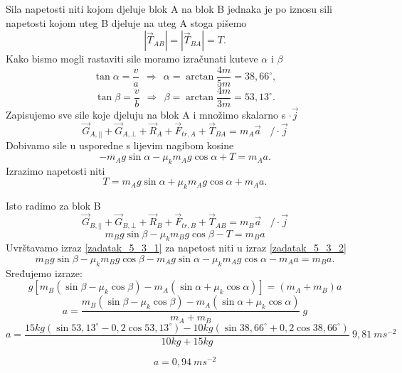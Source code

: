 
Sila napetosti niti kojom djeluje blok A na blok B jednaka je po iznosu sili napetosti kojom uteg B 
djeluje na uteg A stoga pišemo
$$ |\vec{T}_{AB}|=|\vec{T}_{BA}|=T. $$ 
Kako bismo mogli rastaviti sile moramo izračunati kuteve $\alpha$ i $\beta$
$$\tan\alpha=\frac{v}{a}   \ \ \Rightarrow \ \  \alpha=\arctan\frac{4m}{5m}=38,66^\circ, $$
$$\tan\beta=\frac{v}{b}   \ \ \Rightarrow \ \  \beta=\arctan\frac{4m}{3m}=53,13^\circ .$$
Zapisujemo sve sile koje djeluju na blok A i množimo skalarno s $\cdot\vec{j}$ 
$$\vec{G}_{A,||} + \vec{G}_{A,\bot} + \vec{R}_A + \vec{F}_{tr,A} + \vec{T}_{BA}=m_A \vec{a}  \ \ \ \  /\cdot\vec{j}   $$
Dobivamo sile u usporedne s lijevim nagibom kosine
$$ -m_Ag\sin\alpha - \mu_km_Ag\cos\alpha + T =m_Aa. $$
Izrazimo napetosti niti
\begin{equation}
 T= m_Ag\sin\alpha + \mu_km_Ag\cos\alpha + m_Aa. 
 \label{zadatak_5_3_1}
\end{equation}
 
Isto radimo za blok B
$$\vec{G}_{B,||} + \vec{G}_{B,\bot} + \vec{R}_B + \vec{F}_{tr,B} + \vec{T}_{AB}=m_B \vec{a}  \ \ \ \  /\cdot\vec{j}   $$
\begin{equation}
 m_Bg \sin\beta - \mu_km_Bg\cos\beta - T =m_Ba
 \label{zadatak_5_3_2}
\end{equation} 
Uvrštavamo izraz \ref{zadatak_5_3_1} za napetost niti u izraz \ref{zadatak_5_3_2}
$$ m_Bg \sin\beta - \mu_km_Bg\cos\beta - m_Ag\sin\alpha - \mu_km_Ag\cos\alpha - m_Aa =m_Ba.$$
Sređujemo izraze:
$$ g\left[ m_B(\sin\beta - \mu_k\cos\beta ) - m_A (\sin\alpha + \mu_k\cos\alpha) \right] =(m_A + m_B)a$$
$$ a = \frac{m_B(\sin\beta - \mu_k\cos\beta ) - m_A (\sin\alpha + \mu_k\cos\alpha)}{m_A + m_B}\ g$$
$$ a = \frac{15kg(\sin53,13^\circ - 0,2\cos53,13^\circ) - 10kg(\sin38,66^\circ + 0,2 \cos38,66^\circ )}
{10kg+15kg}\ 9,81 \ ms^{-2} $$

$$a = 0,94  \ ms^{-2}  $$




